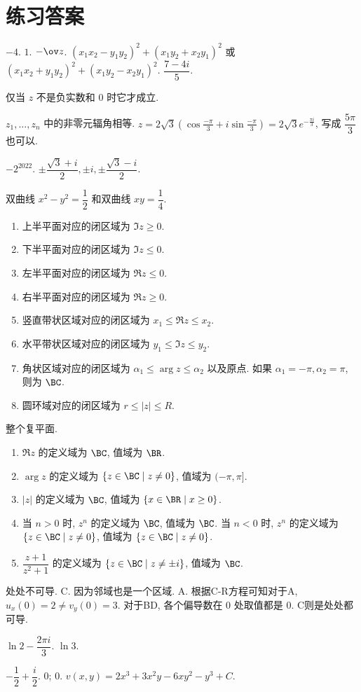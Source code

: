 
\chapter*{练习答案}
\setcounter{chapter}{0}
\setcounter{exer}{0}

\exans $-4$.
\exans $1$.
\exans $-\ov z$.
\exans $(x_1x_2-y_1y_2)^2+(x_1y_2+x_2y_1)^2$ 或 $(x_1x_2+y_1y_2)^2+(x_1y_2-x_2y_1)^2$.
\exans $\dfrac{7-4i}5$.

\exans 仅当 $z$ 不是负实数和 $0$ 时它才成立.

\exans $z_1,\dots,z_n$ 中的非零元辐角相等.
\exans $\displaystyle z=2\sqrt3\left(\cos\frac{-\pi}3+i\sin\frac{-\pi}3\right)=2\sqrt3e^{-\frac{\pi i}3}$, 写成 $\dfrac{5\pi}3$ 也可以.

\exans $-2^{2022}$.
\exans $\pm\dfrac{\sqrt3+i}2,\pm i,\pm\dfrac{\sqrt3-i}2$.

\exans 双曲线 $x^2-y^2=\dfrac12$ 和双曲线 $xy=\dfrac14$.
\exans
\begin{enumerate}
	\item 上半平面对应的闭区域为 $\Im z\ge0$.
	\item 下半平面对应的闭区域为 $\Im z\le0$.
	\item 左半平面对应的闭区域为 $\Re z\le0$.
	\item 右半平面对应的闭区域为 $\Re z\ge0$.
	\item 竖直带状区域对应的闭区域为 $x_1\le\Re z\le x_2$.
	\item 水平带状区域对应的闭区域为 $y_1\le\Im z\le y_2$.
	\item 角状区域对应的闭区域为 $\alpha_1\le \arg z\le \alpha_2$ 以及原点. 如果 $\alpha_1=-\pi,\alpha_2=\pi$, 则为 $\BC$.
	\item 圆环域对应的闭区域为 $r\le|z|\le R$.
\end{enumerate}
\exans 整个复平面.

\exans
\begin{enumerate}
	\item $\Re z$ 的定义域为 $\BC$, 值域为 $\BR$.
	\item $\arg z$ 的定义域为 $\{z\in\BC\mid z\neq 0\}$, 值域为 $(-\pi,\pi]$.
	\item $|z|$ 的定义域为 $\BC$, 值域为 $\{x\in\BR\mid x\ge0\}$.
	\item 当 $n>0$ 时, $z^n$ 的定义域为 $\BC$, 值域为 $\BC$.
	当 $n<0$ 时, $z^n$ 的定义域为 $\{z\in\BC\mid z\neq 0\}$, 值域为 $\{z\in\BC\mid z\neq 0\}$.
	\item $\dfrac{z+1}{z^2+1}$ 的定义域为 $\{z\in\BC\mid z\neq \pm i\}$, 值域为 $\BC$.
\end{enumerate}


\setcounter{exer}{0}


\exans 处处不可导.
\exans C. 因为邻域也是一个区域.
\exans A. 根据C-R方程可知对于A, $u_x(0)=2\neq v_y(0)=3$. 对于BD, 各个偏导数在 $0$ 处取值都是 $0$. C则是处处都可导.

\exans $\ln 2-\dfrac{2\pi i}3$.
\exans $\ln 3$.



\sectionExerciseAnswer
\exans $-\dfrac12+\dfrac i2$.
\exans {} $0$;  $0$.
\exans $v(x,y)=2x^3+3x^2y-6xy^2-y^3+C$.
